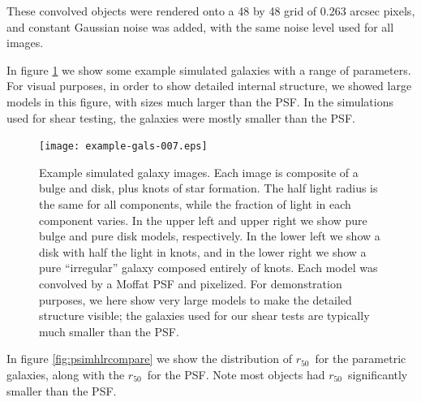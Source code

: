 \documentclass[iop]{emulateapj}
\newcommand{\hlr}{$r_{50}$}
\begin{document}
These convolved objects were rendered onto a 48 by 48 grid of 0.263 arcsec
pixels, and constant Gaussian noise was added, with the same noise level used
for all images.

In figure \ref{fig:parametricgals} we show some example simulated galaxies with
a range of parameters.  For visual purposes, in order to show detailed internal
structure, we showed large models in this figure, with sizes much larger than
the PSF.  In the simulations used for shear testing, the galaxies were mostly
smaller than the PSF.


\begin{figure}[p]
    \centering
    \texttt{[image: example-gals-007.eps]}

    \caption{Example simulated galaxy images.  Each image is composite of a
    bulge and disk, plus knots of star formation.  The half light radius is the
    same for all components, while the fraction of light in each component
    varies.  In the upper left and upper right we show pure bulge and pure disk
    models, respectively.  In the lower left we show a disk with half the light
    in knots, and in the lower right we show a pure ``irregular'' galaxy
    composed entirely of knots.  Each model was convolved by a Moffat PSF
	and pixelized.  For demonstration purposes, we here show very
    large models to make the detailed structure visible; the galaxies used for
    our shear tests are typically much smaller than the PSF. }

	\label{fig:parametricgals}

\end{figure}

In figure \ref{fig:psimhlrcompare} we show the distribution of \hlr\ for the
parametric galaxies, along with the \hlr\ for the PSF.  Note most objects had
\hlr\ significantly smaller than the PSF.
\end{document}
